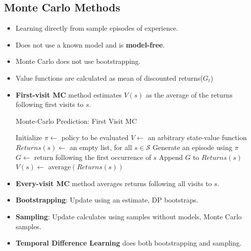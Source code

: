 \documentclass[a4paper]{article}
\begin{document}
\subsection{Monte Carlo Methods}
\begin{itemize}
    \item Learning directly from sample episodes of experience.
    \item Does not use a known model and is \textbf{model-free}.
    \item Monte Carlo does not use bootstrapping.
    \item Value functions are calculated as mean of discounted returns($G_t$)
    \item \textbf{First-visit MC} method estimates $V(s)$ as the average of the returns following first visits to $s$.
    \begin{algorithm}[H]
        \caption{Monte-Carlo Prediction: First Visit MC}
        \begin{algorithmic}[1]
            \LComment Initialize
            \State $\pi \gets$ policy to be evaluated
            \State $V\gets$ an arbitrary state-value function
            \State $Returns(s)\gets$ an empty list, for all $s\in \mathcal{S}$
            \Loop
                \State Generate an episode using $\pi$
                    \State $G\gets$ return following the first occurrence of $s$
                    \State Append $G$ to $Returns(s)$
                    \State $V(s)\gets$ average$(Returns(s))$
                \EndFor
            \EndLoop
        \end{algorithmic}
    \end{algorithm}
    \item \textbf{Every-visit MC} method averages returns following all visits to $s$.
    \item \textbf{Bootstrapping}: Update using an estimate, DP bootstraps.
    \item \textbf{Sampling}: Update calculates using samples without models, Monte Carlo samples.
    \item \textbf{Temporal Difference Learning} does both bootstrapping and sampling.
\end{itemize}
\end{document}
